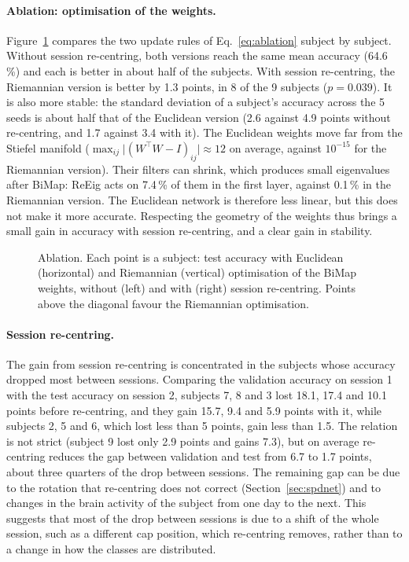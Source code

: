 \paragraph{Ablation: optimisation of the weights.}
Figure~\ref{fig:ablation} compares the two update rules of Eq.~\eqref{eq:ablation} subject by subject. Without session re-centring, both versions reach the same mean accuracy (64.6\,\%) and each is better in about half of the subjects. With session re-centring, the Riemannian version is better by 1.3 points, in 8 of the 9 subjects ($p = 0.039$). It is also more stable: the standard deviation of a subject's accuracy across the 5 seeds is about half that of the Euclidean version (2.6 against 4.9 points without re-centring, and 1.7 against 3.4 with it). The Euclidean weights move far from the Stiefel manifold ($\max_{ij} \lvert (W^\top W - I)_{ij} \rvert \approx 12$ on average, against $10^{-15}$ for the Riemannian version). Their filters can shrink, which produces small eigenvalues after BiMap: ReEig acts on 7.4\,\% of them in the first layer, against 0.1\,\% in the Riemannian version. The Euclidean network is therefore less linear, but this does not make it more accurate. Respecting the geometry of the weights thus brings a small gain in accuracy with session re-centring, and a clear gain in stability.

\begin{figure}[htbp]
  \centering
  \caption{Ablation. Each point is a subject: test accuracy with Euclidean (horizontal) and Riemannian (vertical) optimisation of the BiMap weights, without (left) and with (right) session re-centring. Points above the diagonal favour the Riemannian optimisation.}
  \label{fig:ablation}
\end{figure}

\paragraph{Session re-centring.}
The gain from session re-centring is concentrated in the subjects whose accuracy dropped most between sessions. Comparing the validation accuracy on session 1 with the test accuracy on session 2, subjects 7, 8 and 3 lost 18.1, 17.4 and 10.1 points before re-centring, and they gain 15.7, 9.4 and 5.9 points with it, while subjects 2, 5 and 6, which lost less than 5 points, gain less than 1.5. The relation is not strict (subject 9 lost only 2.9 points and gains 7.3), but on average re-centring reduces the gap between validation and test from 6.7 to 1.7 points, about three quarters of the drop between sessions. The remaining gap can be due to the rotation that re-centring does not correct (Section~\ref{sec:spdnet}) and to changes in the brain activity of the subject from one day to the next. This suggests that most of the drop between sessions is due to a shift of the whole session, such as a different cap position, which re-centring removes, rather than to a change in how the classes are distributed.


